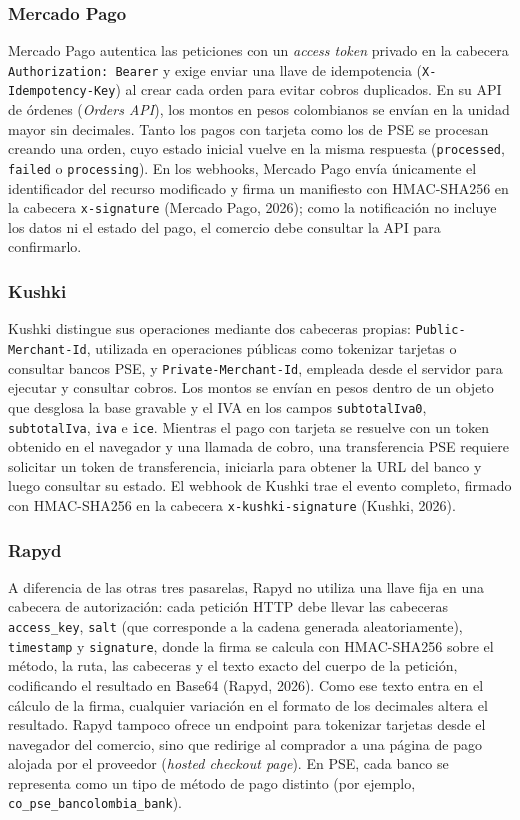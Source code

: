 \subsubsection{Mercado Pago}
Mercado Pago autentica las peticiones con un \textit{access token} privado en la cabecera \texttt{Authorization: Bearer} y exige enviar una llave de idempotencia (\texttt{X-Idempotency-Key}) al crear cada orden para evitar cobros duplicados. En su API de órdenes (\textit{Orders API}), los montos en pesos colombianos se envían en la unidad mayor sin decimales. Tanto los pagos con tarjeta como los de PSE se procesan creando una orden, cuyo estado inicial vuelve en la misma respuesta (\texttt{processed}, \texttt{failed} o \texttt{processing}). En los webhooks, Mercado Pago envía únicamente el identificador del recurso modificado y firma un manifiesto con HMAC-SHA256 en la cabecera \texttt{x-signature} (Mercado Pago, 2026); como la notificación no incluye los datos ni el estado del pago, el comercio debe consultar la API para confirmarlo.

\subsubsection{Kushki}
Kushki distingue sus operaciones mediante dos cabeceras propias: \texttt{Public-Merchant-Id}, utilizada en operaciones públicas como tokenizar tarjetas o consultar bancos PSE, y \texttt{Private-Merchant-Id}, empleada desde el servidor para ejecutar y consultar cobros. Los montos se envían en pesos dentro de un objeto que desglosa la base gravable y el IVA en los campos \texttt{subtotalIva0}, \texttt{subtotalIva}, \texttt{iva} e \texttt{ice}. Mientras el pago con tarjeta se resuelve con un token obtenido en el navegador y una llamada de cobro, una transferencia PSE requiere solicitar un token de transferencia, iniciarla para obtener la URL del banco y luego consultar su estado. El webhook de Kushki trae el evento completo, firmado con HMAC-SHA256 en la cabecera \texttt{x-kushki-signature} (Kushki, 2026).

\subsubsection{Rapyd}
A diferencia de las otras tres pasarelas, Rapyd no utiliza una llave fija en una cabecera de autorización: cada petición HTTP debe llevar las cabeceras \texttt{access\_key}, \texttt{salt} (que corresponde a la cadena generada aleatoriamente), \texttt{timestamp} y \texttt{signature}, donde la firma se calcula con HMAC-SHA256 sobre el método, la ruta, las cabeceras y el texto exacto del cuerpo de la petición, codificando el resultado en Base64 (Rapyd, 2026). Como ese texto entra en el cálculo de la firma, cualquier variación en el formato de los decimales altera el resultado. Rapyd tampoco ofrece un endpoint para tokenizar tarjetas desde el navegador del comercio, sino que redirige al comprador a una página de pago alojada por el proveedor (\textit{hosted checkout page}). En PSE, cada banco se representa como un tipo de método de pago distinto (por ejemplo, \texttt{co\_pse\_bancolombia\_bank}).

